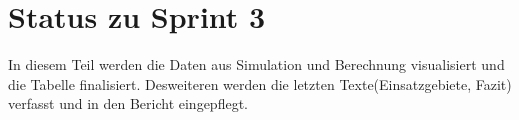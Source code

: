 \section{Status zu Sprint 3
}\label{sec:status}

In diesem Teil werden die Daten aus Simulation und Berechnung visualisiert und die Tabelle finalisiert.
Desweiteren werden die letzten Texte(Einsatzgebiete, Fazit) verfasst und in den Bericht eingepflegt.

